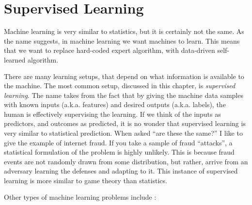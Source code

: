 \documentclass[]{book}
\theoremstyle{definition}
\theoremstyle{definition}
\theoremstyle{definition}
\theoremstyle{remark}
\begin{document}
\hypertarget{supervised}{%
\chapter{Supervised Learning}\label{supervised}}

Machine learning is very similar to statistics, but it is certainly not the same.
As the name suggests, in machine learning we want machines to learn.
This means that we want to replace hard-coded expert algorithm, with data-driven self-learned algorithm.

There are many learning setups, that depend on what information is available to the machine.
The most common setup, discussed in this chapter, is \emph{supervised learning}.
The name takes from the fact that by giving the machine data samples with known inputs (a.k.a. features) and desired outputs (a.k.a. labels), the human is effectively supervising the learning.
If we think of the inputs as predictors, and outcomes as predicted, it is no wonder that supervised learning is very similar to statistical prediction.
When asked ``are these the same?'' I like to give the example of internet fraud.
If you take a sample of fraud ``attacks'', a statistical formulation of the problem is highly unlikely.
This is because fraud events are not randomly drawn from some distribution, but rather, arrive from an adversary learning the defenses and adapting to it.
This instance of supervised learning is more similar to game theory than statistics.

Other types of machine learning problems include \citep{sammut2011encyclopedia}:
\end{document}
